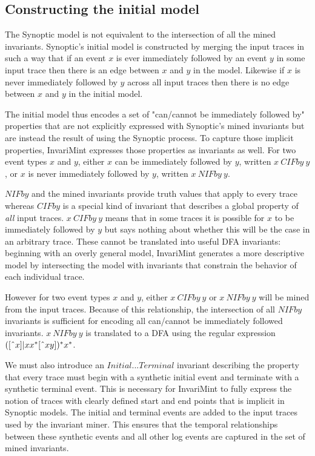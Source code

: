 \subsection{Constructing the initial model}
The Synoptic model is not equivalent to the intersection of all the mined
invariants. Synoptic's initial model is constructed by merging the input traces in such a
way that if an event $x$ is ever immediately followed by an event $y$ in some input trace
then there is an edge between $x$ and $y$ in the model. Likewise
if $x$ is never immediately followed by $y$ across all input traces
then there is no edge between $x$ and $y$ in the initial model.

The initial model thus encodes a set of "can/cannot be immediately
followed by" properties that are not explicitly expressed with Synoptic's 
mined invariants but are instead the result of using the Synoptic process.
To capture those implicit properties, InvariMint expresses those properties as
invariants as well. For two event types $x$ and $y$, either $x$ can be
immediately followed by $y$, written $x~CIFby~y$, or $x$ is never immediately
followed by $y$, written $x~NIFby~y$.

$NIFby$ and the mined invariants
provide truth values that apply to every trace whereas
$CIFby$ is a special kind of invariant that describes a global property of
\emph{all} input traces. $x~CIFby~y$ means that in some traces it is possible
for $x$ to
be immediately followed by $y$ but says nothing about whether this will be the
case in an arbitrary trace.
These cannot be translated into useful DFA invariants: beginning with an
overly general model, InvariMint generates a more descriptive model
by intersecting the model with invariants that
constrain the behavior of each individual trace.

\newcommand\XOR{\mathbin{\char`\^}}
However for two event types $x$ and $y$, either $x~CIFby~y$ or $x~NIFby~y$ will be mined
from the input traces. Because of this relationship, the intersection of
all $NIFby$ invariants is sufficient for encoding all can/cannot be immediately
followed invariants. $x~NIFby~y$ is translated to a DFA using the regular
expression $([\XOR x]|xx^*[\XOR xy])^*x^*$.

We must also introduce an $Initial...Terminal$ invariant describing
the property that every trace must begin with a synthetic initial event and
terminate with a synthetic terminal event. This is necessary for InvariMint to
fully express the notion of traces with
clearly defined start and end points that is implicit in Synoptic models.
The initial and terminal events are
added to the input traces used by the invariant miner. This ensures that the temporal
relationships between these synthetic events and all other log events are
captured in the set of mined invariants. 

